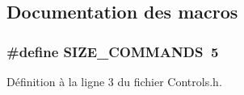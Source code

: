 \subsection{Documentation des macros}
\hypertarget{a00021_a7feb75c30d4fd29d9d2480bce84ad249}{
\subsubsection[{SIZE\_\-COMMANDS}]{\setlength{\rightskip}{0pt plus 5cm}\#define SIZE\_\-COMMANDS~5}}
\label{a00021_a7feb75c30d4fd29d9d2480bce84ad249}


Définition à la ligne 3 du fichier Controls.h.



